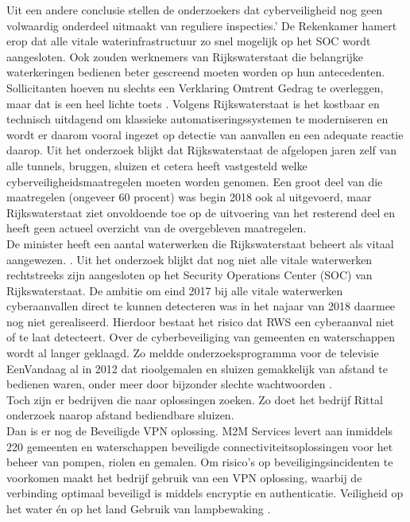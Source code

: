 \documentclass{article}
\begin{document}
	Uit een andere conclusie stellen de onderzoekers dat cyberveiligheid nog geen volwaardig onderdeel uitmaakt van reguliere inspecties.’ De Rekenkamer hamert erop dat alle vitale waterinfrastructuur zo snel mogelijk op het SOC wordt aangesloten. Ook zouden werknemers van Rijkswaterstaat die belangrijke waterkeringen bedienen beter gescreend moeten worden op hun antecedenten. Sollicitanten hoeven nu slechts een Verklaring Omtrent Gedrag te overleggen, maar dat is een heel lichte toets
	\cite{hackerWaterwerk}.
	Volgens Rijkswaterstaat\cite{kramerZeeland} is het kostbaar en technisch uitdagend om klassieke automatiseringssystemen te moderniseren en wordt er daarom vooral ingezet op detectie van aanvallen en een adequate reactie daarop.
	Uit het onderzoek blijkt dat Rijkswaterstaat de afgelopen jaren zelf van alle tunnels, bruggen, sluizen et cetera heeft vastgesteld welke cyberveiligheidsmaatregelen moeten worden genomen. Een groot deel van die maatregelen (ongeveer 60 procent) was begin 2018 ook al uitgevoerd, maar Rijkswaterstaat ziet onvoldoende toe op de uitvoering van het resterend deel en heeft geen actueel overzicht van de overgebleven maatregelen.\\
	De minister heeft een aantal waterwerken die Rijkswaterstaat beheert als vitaal aangewezen. . Uit het onderzoek blijkt dat nog niet alle vitale waterwerken rechtstreeks zijn aangesloten op het Security Operations Center (SOC) van Rijkswaterstaat. De ambitie om eind 2017 bij alle vitale waterwerken cyberaanvallen direct te kunnen detecteren was in het najaar van 2018 daarmee nog niet gerealiseerd. Hierdoor bestaat het risico dat RWS een cyberaanval niet of te laat detecteert\cite{cybersecWaterwerk}.
	Over de cyberbeveiliging van gemeenten en waterschappen wordt al langer geklaagd. Zo meldde onderzoeksprogramma voor de televisie EenVandaag al in 2012 dat rioolgemalen en sluizen gemakkelijk van afstand te bedienen waren, onder meer door bijzonder slechte wachtwoorden \cite{cybersecWaterschappen}. \\
	Toch zijn er bedrijven die naar oplossingen zoeken. Zo doet het bedrijf Rittal  onderzoek naarop afstand bediendbare sluizen\cite{cybersecZuidHolland}. \\
	Dan is er nog de Beveiligde VPN oplossing. M2M Services levert aan inmiddels 220 gemeenten en waterschappen beveiligde connectiviteitsoplossingen voor het beheer van pompen, riolen en gemalen. Om risico’s op beveiligingsincidenten te voorkomen maakt het bedrijf gebruik van een VPN oplossing, waarbij de verbinding optimaal beveiligd is middels encryptie en authenticatie\cite{waterwerkNED}.
	Veiligheid op het water én op het land Gebruik van lampbewaking \cite{veiligheidwaterland}. 
\end{document}
